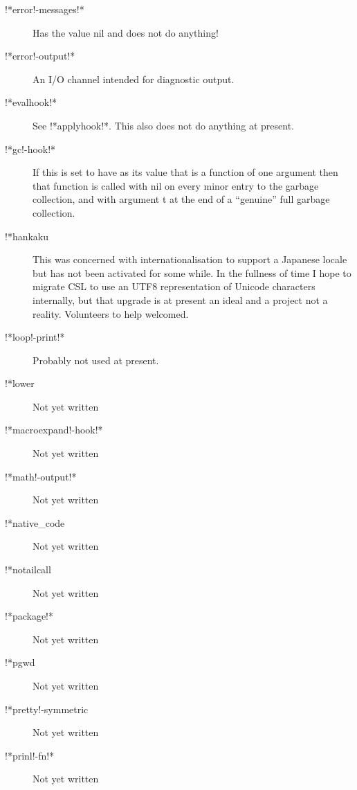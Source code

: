 \documentclass[a4paper,11pt]{article}
\begin{document}
\begin{description}
\item [{\ttfamily !*error!-messages!*}]
Has the value nil and does not do anything!

\item [{\ttfamily !*error!-output!*}]
An I/O channel intended for diagnostic output.

\item [{\ttfamily !*evalhook!*}]
See {\ttfamily !*applyhook!*}. This also does not do anything at present.

\item [{\ttfamily !*gc!-hook!*}]
If this is set to have as its value that is a function of one argument then
that function is called with {\ttfamily nil} on every minor entry to the
garbage collection, and with argument {\ttfamily t} at the end of a ``genuine''
full garbage collection.

\item [{\ttfamily !*hankaku}]
This was concerned with internationalisation to support a Japanese
locale but has not been activated for some while. In the fullness of time I
hope to migrate CSL to use an UTF8 representation of Unicode characters
internally, but that upgrade is at present an ideal and a project not
a reality. Volunteers to help welcomed.

\item [{\ttfamily !*loop!-print!*}]
Probably not used at present.

\item [{\ttfamily !*lower}]
Not yet written

\item [{\ttfamily !*macroexpand!-hook!*}]
Not yet written

\item [{\ttfamily !*math!-output!*}]
Not yet written

\item [{\ttfamily !*native\_code}]
Not yet written

\item [{\ttfamily !*notailcall}]
Not yet written

\item [{\ttfamily !*package!*}]
Not yet written

\item [{\ttfamily !*pgwd}]
Not yet written

\item [{\ttfamily !*pretty!-symmetric}]
Not yet written

\item [{\ttfamily !*prinl!-fn!*}]
Not yet written


\end{description}
\end{document}
